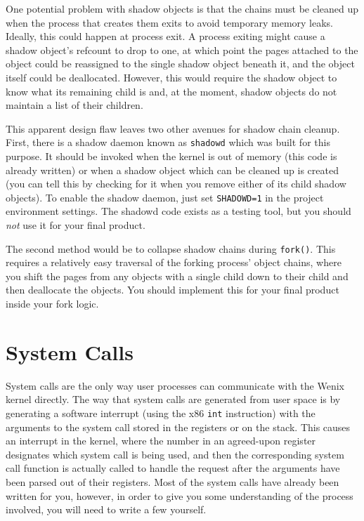 One potential problem with shadow objects is that the chains must be cleaned up when the process that creates them exits to avoid temporary memory leaks. Ideally, this could happen at process exit. A process exiting might cause a shadow object's refcount to drop to one, at which point the pages attached to the object could be reassigned to the single shadow object beneath it, and the object itself could be deallocated. However, this would require the shadow object to know what its remaining child is and, at the moment, shadow objects do not maintain a list of their children.

This apparent design flaw leaves two other avenues for shadow chain cleanup. First, there is a shadow daemon known as \texttt{shadowd} which was built for this purpose. It should be invoked when the kernel is out of memory (this code is already written) or when a shadow object which can be cleaned up is created (you can tell this by checking for it when you remove either of its child shadow objects). To enable the shadow daemon, just set \texttt{SHADOWD=1} in the project environment settings. The shadowd code exists as a testing tool, but you should \emph{not} use it for your final product. 

The second method would be to collapse shadow chains during \texttt{fork()}. This requires a relatively easy traversal of the forking process' object chains, where you shift the pages from any objects with a single child down to their child and then deallocate the objects. You should implement this for your final product inside your fork logic. 

\section{System Calls}

System calls are the only way user processes can communicate with the Wenix kernel directly. The way that system calls are generated from user space is by generating a software interrupt (using the x86 \texttt{int} instruction) with the arguments to the system call stored in the registers or on the stack. This causes an interrupt in the kernel, where the number in an agreed-upon register designates which system call is being used, and then the corresponding system call function is actually called to handle the request after the arguments have been parsed out of their registers. Most of the system calls have already been written for you, however, in order to give you some understanding of the process involved, you will need to write a few yourself.


